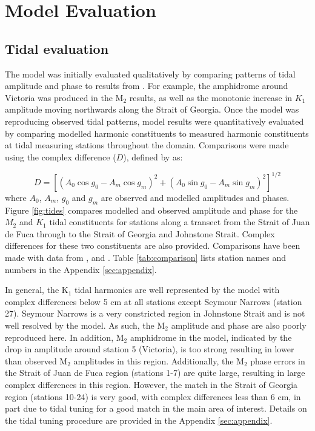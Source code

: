 \documentclass[pdftex,10pt]{article}
\begin{document}
\section{Model Evaluation}\label{sec:model}

\subsection{Tidal evaluation}
The model was initially evaluated qualitatively by comparing patterns of tidal amplitude and phase to results from \citep{foreman1995tidal}. For example, the amphidrome around Victoria was produced in the M$_2$ results, as well as the monotonic increase in $K_1$ amplitude moving northwards along the Strait of Georgia. Once the model was reproducing observed tidal patterns, model results were quantitatively evaluated by comparing modelled harmonic constituents to measured harmonic constituents at tidal measuring stations throughout the domain. Comparisons were made using the complex difference ($D$), defined by \citep{foreman1995tidal} as:

\begin{equation}
D = [(A_0 \cos g_0 - A_m \cos g_m)^2 + (A_0 \sin g_0 - A_m \sin g_m)^2]^{1/2}
\end{equation}\label{eq:compdiff}
where $A_0$, $A_m$, $g_0$ and $g_m$ are observed and modelled amplitudes and phases. Figure \ref{fig:tides} compares modelled and observed amplitude and phase for the $M_2$ and $K_1$ tidal constituents for stations along a transect from the Strait of Juan de Fuca through to the Strait of Georgia and Johnstone Strait. Complex differences for these two constituents are also provided.  Comparisons have been made with data from \citet{foreman1995tidal}, \citet{foreman2004m} and \citet{foreman2012circulation}. Table  \ref{tab:comparison} lists station names and numbers in the Appendix \ref{sec:appendix}. 

In general, the K$_1$ tidal harmonics are well represented by the model with complex differences below 5 cm at all stations except Seymour Narrows (station 27). Seymour Narrows is a very constricted region in Johnstone Strait and is not well resolved by the model. As such, the M$_2$ amplitude and phase are also poorly reproduced here. In addition, M$_2$ amphidrome in the model, indicated by the drop in amplitude around station 5 (Victoria), is too strong resulting in lower than observed M$_2$ amplitudes in this region. Additionally, the M$_2$ phase errors in the Strait of Juan de Fuca region (stations 1-7) are quite large, resulting in large complex differences in this region.  However, the match in the Strait of Georgia region (stations 10-24) is very good, with complex differences less than 6 cm, in part due to tidal tuning for a good match in the main area of interest. Details on the tidal tuning procedure are provided in the Appendix \ref{sec:appendix}.
\end{document}
